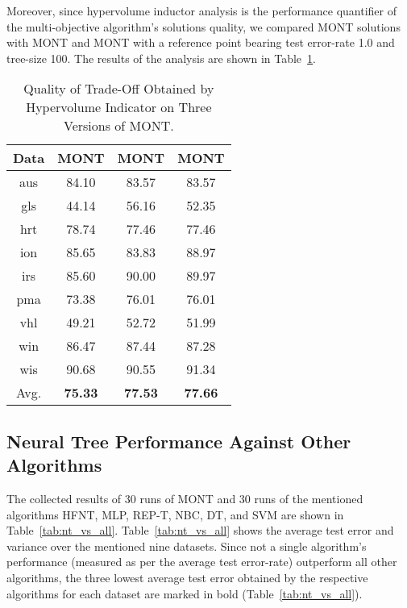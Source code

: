 \documentclass[conference]{IEEEtran}
\begin{document}
Moreover, since hypervolume inductor analysis is the performance quantifier of the multi-objective algorithm's solutions quality, we compared MONT solutions with MONT and MONT with a reference point bearing test error-rate 1.0 and tree-size 100. The results of the analysis are shown in Table~\ref{tab:hv_res}.
\begin{table}
    \begin{center}
        \renewcommand{\arraystretch}{1}
        \setlength{\tabcolsep}{10pt}
        {\caption{Quality of Trade-Off Obtained by Hypervolume Indicator  on Three Versions of MONT. }\label{tab:hv_res}}        
        \begin{tabular}{cccc}
            \hline
            Data & MONT & MONT & MONT\\
            \hline
            aus & 84.10 & 83.57 & 83.57\\
            gls & 44.14 & 56.16 & 52.35\\
            hrt & 78.74 & 77.46 & 77.46\\
            ion & 85.65 & 83.83 & 88.97\\
            irs & 85.60 & 90.00 & 89.97\\
            pma & 73.38 & 76.01 & 76.01\\
            vhl & 49.21 & 52.72 & 51.99\\
            win & 86.47 & 87.44 & 87.28\\
            wis & 90.68 & 90.55 & 91.34\\
            \hline
            Avg. & \textbf{75.33} & \textbf{77.53} & \textbf{77.66}\\
            \hline
        \end{tabular}
    \end{center}
\end{table}

\subsection{Neural Tree Performance Against Other Algorithms}
\label{sec:res_nt_vs_all}
The collected results of 30 runs of MONT and 30 runs of the mentioned algorithms HFNT, MLP, REP-T, NBC, DT, and SVM are shown in Table~\ref{tab:nt_vs_all}. Table~\ref{tab:nt_vs_all} shows the average test error and variance over the mentioned nine datasets. Since not a single algorithm's performance (measured as per the average test error-rate) outperform all other algorithms, the three lowest average test error obtained by the respective algorithms for each dataset are marked in bold (Table~\ref{tab:nt_vs_all}). 
\end{document}

